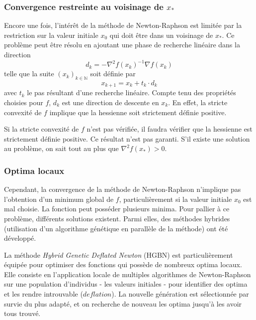 \documentclass[3p, twocolumn]{elsarticle}
\begin{document}
\subsubsection{Convergence restreinte au voisinage de $x_*$}
Encore une fois, l'intérêt de la méthode de Newton-Raphson est limitée par la restriction sur la valeur initiale $x_0$ qui doit être dans un voisinage de $x_*$.
Ce problème peut être résolu en ajoutant une phase de recherche linéaire dans la direction
\begin{equation*}
    d_{k} = -\nabla ^{2}f(x_{k})^{-1} \nabla f(x_{k})
\end{equation*}
telle que la suite $(x_k)_{k\in \mathbb{N}}$ soit définie par
\begin{equation}
    x_{k+1}=x_k+t_k\cdot d_k
    \label{eq:nr-opt-mono}
\end{equation} 
avec $t_k$ le pas résultant d'une recherche linéaire.
Compte tenu des propriétés choisies pour $f$, $d_k$ est une direction de descente en $x_k$. En effet, la stricte convexité de $f$ implique que la hessienne soit strictement définie positive.
\begin{rmk}
    Si la stricte convexité de $f$ n'est pas vérifiée, il faudra vérifier que la hessienne est strictement définie positive. Ce résultat n'est pas garanti. S'il existe une solution au problème, on sait tout au plus que $\nabla^2f(x_*)>0$.
\end{rmk}

\subsubsection{Optima locaux}
Cependant, la convergence de la méthode de Newton-Raphson n'implique pas l'obtention d'un minimum global de $f$, particulièrement si la valeur initiale $x_0$ est mal choisie. La fonction peut posséder plusieurs minima. Pour pallier à ce problème, différents solutions existent. Parmi elles, des méthodes hybrides (utilisation d'un algorithme génétique en parallèle de la méthode) ont été développé.

La méthode \textit{Hybrid Genetic Deflated Newton} (HGBN) \cite{art:Noack_Funke_2017} est particulièrement équipée pour optimiser des fonctions qui possède de nombreux optima locaux. Elle consiste en l'application locale de multiples algorithmes de Newton-Raphson sur une population d'individus - les valeurs initiales - pour identifier des optima et les rendre introuvable ($deflation$). La nouvelle génération est sélectionnée par survie du plus adapté, et on recherche de nouveau les optima jusqu'à les avoir tous trouvé.
\end{document}
